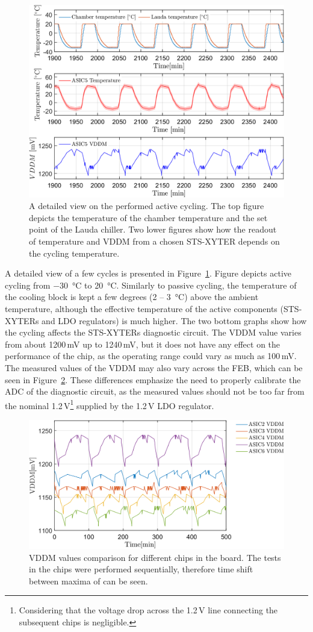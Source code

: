\begin{figure}[!h]
\centering
\includegraphics[width=0.65\columnwidth]{Chapter4/images/FEB0ASIC5COMP.png}
\caption{A detailed view on the performed active cycling. The top figure depicts the temperature of the chamber temperature and the set point of the Lauda chiller. Two lower figures show how the readout of temperature and VDDM from a chosen STS-XYTER depends on the cycling temperature. }
\label{fig_active_detailed}
\end{figure}
A detailed view of a few cycles is presented in Figure~\ref{fig_active_detailed}. Figure depicts active cycling from \SI{-30}{\celsius} to \SI{20}{\celsius}. Similarly to passive cycling, the temperature of the cooling block is kept a few degrees (2 -- \SI{3}{\celsius}) above the ambient temperature, although the effective temperature of the active components (STS-XYTERs and \gls{LDO} regulators) is much higher. The two bottom graphs show how the cycling affects the STS-XYTERs diagnostic circuit. The VDDM value varies from about 1200\,mV up to 1240\,mV, but it does not have any effect on the performance of the chip, as the operating range could vary as much as 100\,mV. The measured values of the VDDM may also vary across the \gls{FEB}, which can be seen in Figure~\ref{feb_vary}. These differences emphasize the need to properly calibrate the ADC of the diagnostic circuit, as the measured values should not be too far from the nominal 1.2\,V\footnote{Considering that the voltage drop across the 1.2\,V line connecting the subsequent chips is negligible.} supplied by the 1.2\,V \gls{LDO} regulator. 
\begin{figure}[!h]
\centering
\includegraphics[width=0.75\columnwidth]{Chapter4/images/vddm_comp.png}
\caption{VDDM values comparison for different chips in the board. The tests in the chips were performed sequentially, therefore time shift between maxima of  can be seen.}
\label{feb_vary}
\end{figure}

